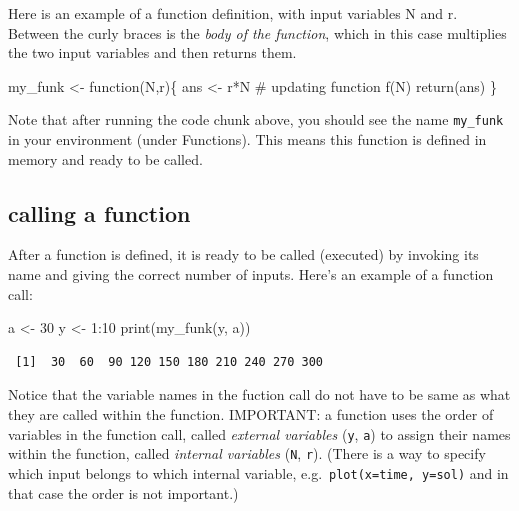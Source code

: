 \documentclass[
  letterpaper,
  DIV=11,
  numbers=noendperiod]{scrreprt}
\newenvironment{Shaded}{\begin{snugshade}}{\end{snugshade}}
\newcommand{\CommentTok}[1]{\textcolor[rgb]{0.37,0.37,0.37}{#1}}
\newcommand{\ControlFlowTok}[1]{\textcolor[rgb]{0.00,0.23,0.31}{#1}}
\newcommand{\DecValTok}[1]{\textcolor[rgb]{0.68,0.00,0.00}{#1}}
\newcommand{\FunctionTok}[1]{\textcolor[rgb]{0.28,0.35,0.67}{#1}}
\newcommand{\NormalTok}[1]{\textcolor[rgb]{0.00,0.23,0.31}{#1}}
\newcommand{\OtherTok}[1]{\textcolor[rgb]{0.00,0.23,0.31}{#1}}
\newcommand{\SpecialCharTok}[1]{\textcolor[rgb]{0.37,0.37,0.37}{#1}}
\begin{document}
Here is an example of a function definition, with input variables N and
r. Between the curly braces is the \emph{body of the function}, which in
this case multiplies the two input variables and then returns them.

\begin{Shaded}
\begin{Highlighting}[]
\NormalTok{my\_funk }\OtherTok{\textless{}{-}} \ControlFlowTok{function}\NormalTok{(N,r)\{ }
\NormalTok{  ans }\OtherTok{\textless{}{-}}\NormalTok{ r}\SpecialCharTok{*}\NormalTok{N }\CommentTok{\# updating function f(N)}
  \FunctionTok{return}\NormalTok{(ans)}
\NormalTok{\}}
\end{Highlighting}
\end{Shaded}

Note that after running the code chunk above, you should see the name
\texttt{my\_funk} in your environment (under Functions). This means this
function is defined in memory and ready to be called.

\hypertarget{calling-a-function}{%
\subsection{calling a function}\label{calling-a-function}}

After a function is defined, it is ready to be called (executed) by
invoking its name and giving the correct number of inputs. Here's an
example of a function call:

\begin{Shaded}
\begin{Highlighting}[]
\NormalTok{a }\OtherTok{\textless{}{-}} \DecValTok{30}
\NormalTok{y }\OtherTok{\textless{}{-}} \DecValTok{1}\SpecialCharTok{:}\DecValTok{10}
\FunctionTok{print}\NormalTok{(}\FunctionTok{my\_funk}\NormalTok{(y, a))}
\end{Highlighting}
\end{Shaded}

\begin{verbatim}
 [1]  30  60  90 120 150 180 210 240 270 300
\end{verbatim}

Notice that the variable names in the fuction call do not have to be
same as what they are called within the function. IMPORTANT: a function
uses the order of variables in the function call, called \emph{external
variables} (\texttt{y}, \texttt{a}) to assign their names within the
function, called \emph{internal variables} (\texttt{N}, \texttt{r}).
(There is a way to specify which input belongs to which internal
variable, e.g.~\texttt{plot(x=time,\ y=sol)} and in that case the order
is not important.)
\end{document}
